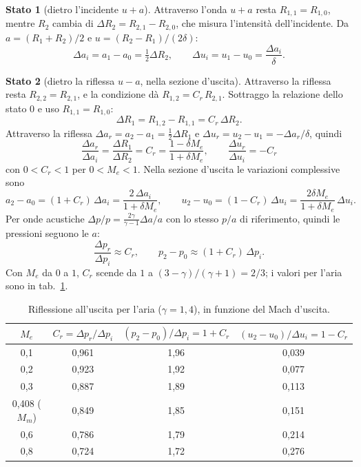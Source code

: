 \documentclass[11pt,a4paper]{article}
\newcommand{\Ru}{R_1}
\newcommand{\Rd}{R_2}
\newcommand{\uma}{u-a}
\newcommand{\upa}{u+a}
\newcommand{\Me}{M_e}
\newcommand{\Cr}{C_r}
\begin{document}
\textbf{Stato 1} (dietro l'incidente $\upa$). Attraverso l'onda $\upa$ resta $R_{1,1}=R_{1,0}$, mentre $\Rd$ cambia
di $\Delta\Rd=R_{2,1}-R_{2,0}$, che misura l'intensità dell'incidente. Da $a=(\Ru+\Rd)/2$ e $u=(\Rd-\Ru)/(2\delta)$:
\[
  \Delta a_i=a_1-a_0=\tfrac12\Delta\Rd,\qquad \Delta u_i=u_1-u_0=\frac{\Delta a_i}{\delta}.
\]

\textbf{Stato 2} (dietro la riflessa $\uma$, nella sezione d'uscita). Attraverso la riflessa resta
$R_{2,2}=R_{2,1}$, e la condizione dà $R_{1,2}=\Cr\,R_{2,1}$. Sottraggo la relazione dello stato 0 e uso
$R_{1,1}=R_{1,0}$:
\[
  \Delta\Ru=R_{1,2}-R_{1,1}=\Cr\,\Delta\Rd .
\]
Attraverso la riflessa $\Delta a_r=a_2-a_1=\tfrac12\Delta\Ru$ e $\Delta u_r=u_2-u_1=-\Delta a_r/\delta$, quindi
\[
  \boxed{\;\frac{\Delta a_r}{\Delta a_i}=\frac{\Delta\Ru}{\Delta\Rd}=\Cr=\frac{1-\delta\Me}{1+\delta\Me},\qquad
  \frac{\Delta u_r}{\Delta u_i}=-\Cr\;}
\]
con $0<\Cr<1$ per $0<\Me<1$. Nella sezione d'uscita le variazioni complessive sono
\[
  a_2-a_0=(1+\Cr)\,\Delta a_i=\frac{2\,\Delta a_i}{1+\delta\Me},\qquad
  u_2-u_0=(1-\Cr)\,\Delta u_i=\frac{2\delta\Me}{1+\delta\Me}\,\Delta u_i .
\]
Per onde acustiche $\Delta p/p=\frac{2\gamma}{\gamma-1}\Delta a/a$ con lo stesso $p/a$ di riferimento, quindi le
pressioni seguono le $a$:
\[
  \frac{\Delta p_r}{\Delta p_i}\approx\Cr,\qquad p_2-p_0\approx(1+\Cr)\,\Delta p_i .
\]
Con $\Me$ da $0$ a $1$, $\Cr$ scende da $1$ a $(3-\gamma)/(\gamma+1)=2/3$; i valori per l'aria sono in
tab.~\ref{tab:C}.

\begin{table}[H]
  \centering
  \begin{tabular}{cccc}
    \toprule
    $\Me$ & $\Cr=\Delta p_r/\Delta p_i$ & $(p_2-p_0)/\Delta p_i=1+\Cr$ & $(u_2-u_0)/\Delta u_i=1-\Cr$ \\
    \midrule
    0,1 & 0,961 & 1,96 & 0,039 \\
    0,2 & 0,923 & 1,92 & 0,077 \\
    0,3 & 0,887 & 1,89 & 0,113 \\
    0,408 ($M_m$) & 0,849 & 1,85 & 0,151 \\
    0,6 & 0,786 & 1,79 & 0,214 \\
    0,8 & 0,724 & 1,72 & 0,276 \\
    \bottomrule
  \end{tabular}
  \caption{Riflessione all'uscita per l'aria ($\gamma=1{,}4$), in funzione del Mach d'uscita.}
  \label{tab:C}
\end{table}
\end{document}
